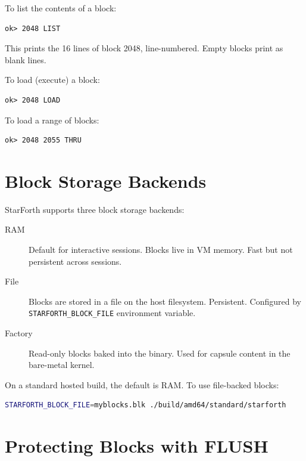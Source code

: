 To list the contents of a block:

\begin{lstlisting}[language=Forth]
ok> 2048 LIST
\end{lstlisting}

This prints the 16 lines of block 2048, line-numbered. Empty blocks print as
blank lines.

To load (execute) a block:

\begin{lstlisting}[language=Forth]
ok> 2048 LOAD
\end{lstlisting}

To load a range of blocks:

\begin{lstlisting}[language=Forth]
ok> 2048 2055 THRU
\end{lstlisting}

\section{Block Storage Backends}
\label{sec:block-backends}

StarForth supports three block storage backends:

\begin{description}
  \item[RAM] Default for interactive sessions. Blocks live in VM memory.
    Fast but not persistent across sessions.
  \item[File] Blocks are stored in a file on the host filesystem. Persistent.
    Configured by \texttt{STARFORTH\_BLOCK\_FILE} environment variable.
  \item[Factory] Read-only blocks baked into the binary. Used for capsule
    content in the bare-metal kernel.
\end{description}

On a standard hosted build, the default is RAM. To use file-backed blocks:

\begin{lstlisting}[language=bash]
STARFORTH_BLOCK_FILE=myblocks.blk ./build/amd64/standard/starforth
\end{lstlisting}

\section{Protecting Blocks with FLUSH}
\label{sec:flush-protection}

